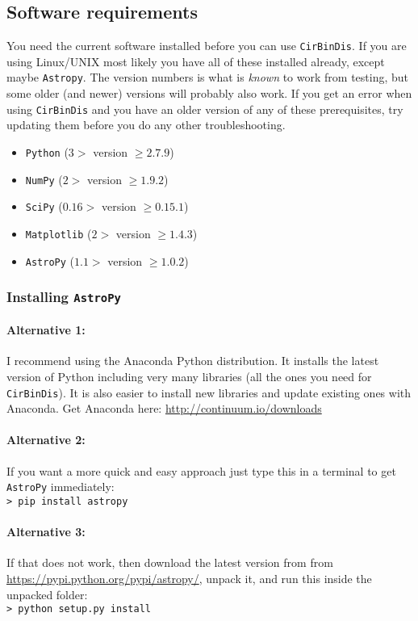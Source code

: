 \documentclass[a4paper, 12pt, english, titlepage]{article}
\newcommand{\sname}{\texttt{CirBinDis}\xspace}
\begin{document}
\subsection{Software requirements}
    You need the current software installed before you can use \sname. 
    If you are using Linux/UNIX most likely you have all of these installed already, except maybe \texttt{Astropy}. 
    The version numbers is what is \emph{known} to work from testing, but some older (and newer) versions will probably also work. If you get an error when using \sname and you have an older version of any of these prerequisites, try updating them before you do any other troubleshooting. 
    \begin{itemize}
        \item \texttt{Python} ($3 >$ version $\geq 2.7.9$)
        \item \texttt{NumPy} ($2 >$ version $\geq 1.9.2$)
        \item \texttt{SciPy} ($0.16 >$ version $\geq 0.15.1$)
        \item \texttt{Matplotlib} ($2 >$ version $\geq 1.4.3$)
        \item \texttt{AstroPy} ($1.1 >$ version $\geq 1.0.2$)
    \end{itemize}

    \subsubsection{Installing \texttt{AstroPy}}
        \paragraph{Alternative 1:}
        I recommend using the Anaconda Python distribution. It installs the latest version of Python including very many libraries (all the ones you need for \sname). It is also easier to install new libraries and update existing ones with Anaconda. 
        Get Anaconda here: \url{http://continuum.io/downloads}

        \paragraph{Alternative 2:}
        If you want a more quick and easy approach just type this in a terminal to get \texttt{AstroPy} immediately: \\
        \texttt{> pip install astropy}

        \paragraph{Alternative 3:}
        If that does not work, then download the latest version from from \url{https://pypi.python.org/pypi/astropy/}, unpack it, and run this inside the unpacked folder: \\
        \texttt{> python setup.py install}
\end{document}
